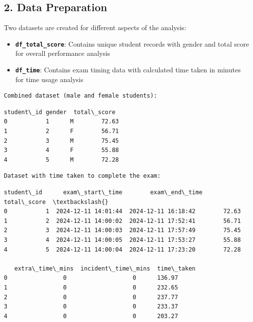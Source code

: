 \documentclass[11pt]{article}
\providecommand{\tightlist}{%
      \setlength{\itemsep}{0pt}\setlength{\parskip}{0pt}}
\begin{document}
    \subsection{2. Data Preparation}\label{data-preparation}

Two datasets are created for different aspects of the analysis:

\begin{itemize}
\tightlist
\item
  \textbf{\texttt{df\_total\_score}}: Contains unique student records
  with gender and total score for overall performance analysis
\item
  \textbf{\texttt{df\_time}}: Contains exam timing data with calculated
  time taken in minutes for time usage analysis
\end{itemize}

    \begin{Verbatim}[commandchars=\\\{\}]
Combined dataset (male and female students):
    \end{Verbatim}

            \begin{tcolorbox}[breakable, size=fbox, boxrule=.5pt, pad at break*=1mm, opacityfill=0]
\begin{Verbatim}[commandchars=\\\{\}]
   student\_id gender  total\_score
0           1      M        72.63
1           2      F        56.71
2           3      M        75.45
3           4      F        55.88
4           5      M        72.28
\end{Verbatim}
\end{tcolorbox}
        
    \begin{Verbatim}[commandchars=\\\{\}]
Dataset with time taken to complete the exam:
    \end{Verbatim}

            \begin{tcolorbox}[breakable, size=fbox, boxrule=.5pt, pad at break*=1mm, opacityfill=0]
\begin{Verbatim}[commandchars=\\\{\}]
   student\_id      exam\_start\_time        exam\_end\_time  total\_score  \textbackslash{}
0           1  2024-12-11 14:01:44  2024-12-11 16:18:42        72.63
1           2  2024-12-11 14:00:02  2024-12-11 17:52:41        56.71
2           3  2024-12-11 14:00:03  2024-12-11 17:57:49        75.45
3           4  2024-12-11 14:00:05  2024-12-11 17:53:27        55.88
4           5  2024-12-11 14:00:04  2024-12-11 17:23:20        72.28

   extra\_time\_mins  incident\_time\_mins  time\_taken
0                0                   0      136.97
1                0                   0      232.65
2                0                   0      237.77
3                0                   0      233.37
4                0                   0      203.27
\end{Verbatim}
\end{tcolorbox}
        
\end{document}

